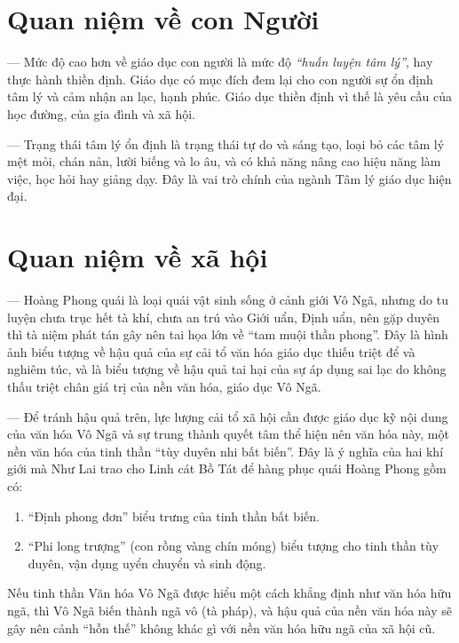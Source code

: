 \section{Quan niệm về con Người} %
\label{sec:20_21_22_con_nguoi}

— Mức độ cao hơn về giáo dục con người là mức độ \emph{``huấn luyện tâm lý''}, hay thực hành thiền định. Giáo dục có mục đích đem lại cho con người sự ổn định tâm lý và cảm nhận an lạc, hạnh phúc. Giáo dục thiền định vì thế là yêu cầu của học đường, của gia đình và xã hội.

— Trạng thái tâm lý ổn định là trạng thái tự do và sáng tạo, loại bỏ các tâm lý mệt mỏi, chán nản, lười biếng và lo âu, và có khả năng nâng cao hiệu năng làm việc, học hỏi hay giảng dạy. Đây là vai trò chính của ngành Tâm lý giáo dục hiện đại.

\section{Quan niệm về xã hội} %
\label{sec:20_21_22_xa_hoi}

— Hoàng Phong quái là loại quái vật sinh sống ở cảnh giới Vô Ngã, nhưng do tu luyện chưa trục hết tà khí, chưa an trú vào Giới uẩn, Định uẩn, nên gặp duyên thì tà niệm phát tán gây nên tai họa lớn về ``tam muội thần phong''. Đây là hình ảnh biểu tượng về hậu quả của sự cải tổ văn hóa giáo dục thiếu triệt để và nghiêm túc, và là biểu tượng về hậu quả tai hại của sự áp dụng sai lạc do không thấu triệt chân giá trị của nền văn hóa, giáo dục Vô Ngã.

— Để tránh hậu quả trên, lực lượng cải tổ xã hội cần được giáo dục kỹ nội dung của văn hóa Vô Ngã và sự trung thành quyết tâm thể hiện nên văn hóa này, một nền văn hóa của tinh thần ``tùy duyên nhi bất biến''. Đây là ý nghĩa của hai khí giới mà Như Lai trao cho Linh cát Bồ Tát để hàng phục quái Hoàng Phong gồm có:

\begin{enumerate}[label=\itshape\arabic*\upshape/]
   \item ``Định phong đơn'' biểu trưng của tinh thần bất biến.

   \item ``Phi long trượng'' (con rồng vàng chín móng) biểu tượng cho tinh thần tùy duyên, vận dụng uyển chuyển và sinh động.
\end{enumerate}

Nếu tinh thần Văn hóa Vô Ngã được hiểu một cách khẳng định như văn hóa hữu ngã, thì Vô Ngã biến thành ngã vô (tà pháp), và hậu quả của nền văn hóa này sẽ gây nên cảnh ``hỗn thế'' không khác gì với nền văn hóa hữu ngã của xã hội cũ.

